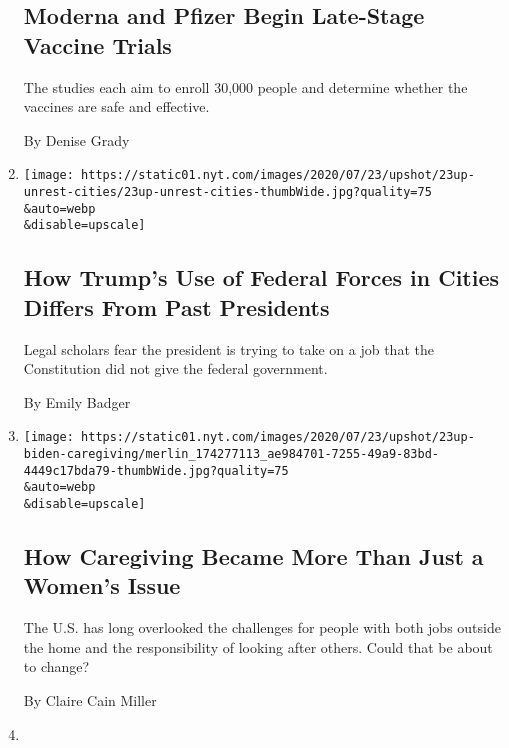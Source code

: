 \begin{enumerate}
  \hypertarget{moderna-and-pfizer-begin-late-stage-vaccine-trials}{%
  \subsection{Moderna and Pfizer Begin Late-Stage Vaccine
  Trials}\label{moderna-and-pfizer-begin-late-stage-vaccine-trials}}

  The studies each aim to enroll 30,000 people and determine whether the
  vaccines are safe and effective.

  By Denise Grady
\item
  \href{/2020/07/23/upshot/trump-portland.html}{}

  \texttt{[image: https://static01.nyt.com/images/2020/07/23/upshot/23up-unrest-cities/23up-unrest-cities-thumbWide.jpg?quality=75\\\&auto=webp\\\&disable=upscale]}

  \hypertarget{how-trumps-use-of-federal-forces-in-cities-differs-from-past-presidents}{%
  \subsection{How Trump's Use of Federal Forces in Cities Differs From
  Past
  Presidents}\label{how-trumps-use-of-federal-forces-in-cities-differs-from-past-presidents}}

  Legal scholars fear the president is trying to take on a job that the
  Constitution did not give the federal government.

  By Emily Badger
\item
  \href{/2020/07/23/upshot/biden-caregiving-plan.html}{}

  \texttt{[image: https://static01.nyt.com/images/2020/07/23/upshot/23up-biden-caregiving/merlin\_174277113\_ae984701-7255-49a9-83bd-4449c17bda79-thumbWide.jpg?quality=75\\\&auto=webp\\\&disable=upscale]}

  \hypertarget{how-caregiving-became-more-than-just-a-womens-issue}{%
  \subsection{How Caregiving Became More Than Just a Women's
  Issue}\label{how-caregiving-became-more-than-just-a-womens-issue}}

  The U.S. has long overlooked the challenges for people with both jobs
  outside the home and the responsibility of looking after others. Could
  that be about to change?

  By Claire Cain Miller
\item
  \href{/2020/07/22/world/canada/asylum-Safe-Third-Country-Agreement.html}{}


\end{enumerate}
